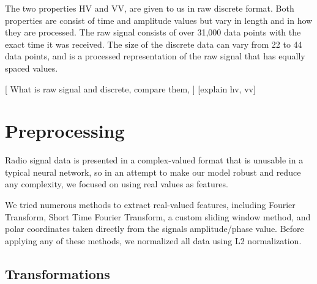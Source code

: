 \documentclass{turabian-thesis}
\begin{document}
The two properties HV and VV, are given to us in raw discrete format. Both properties are consist of time and amplitude values but vary in length and in how they are processed. The raw signal consists of over 31,000 data points with the exact time it was received. The size of the discrete data can vary from 22 to 44 data points, and is a processed representation of the raw signal that has equally spaced values.

[ What is raw signal and discrete, compare them, ]
[explain hv, vv]
\chapter{Preprocessing}
Radio signal data is presented in a complex-valued format that is unusable in a typical neural network, so in an attempt to make our model robust and reduce any complexity, we focused on using real values as features.

We tried numerous methods to extract real-valued features, including Fourier Transform, Short Time Fourier Transform, a custom sliding window method, and polar coordinates taken directly from the signals amplitude/phase value. Before applying any of these methods, we normalized all data using L2 normalization.





\section{Transformations}
\end{document}
